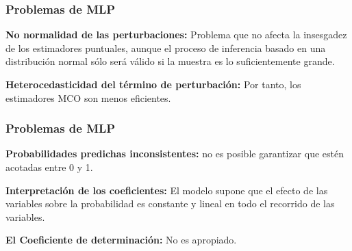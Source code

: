\documentclass[10pt]{beamer}
\begin{document}



\begin{frame}
\frametitle{Problemas de MLP}


\textbf{No normalidad de las perturbaciones:} Problema que no afecta la insesgadez de los estimadores puntuales, aunque el proceso de inferencia basado en una distribución normal sólo será válido si la muestra es lo suficientemente grande. 

\vspace{4mm}

\textbf{Heterocedasticidad del término de perturbación:} Por tanto, los estimadores MCO son menos eficientes. 



\end{frame}





\begin{frame}
\frametitle{Problemas de MLP}


\textbf{Probabilidades predichas inconsistentes:} no es posible garantizar que estén acotadas entre 0 y 1. 

\vspace{4mm}

\textbf{Interpretación de los coeficientes:} El modelo supone que el efecto de las variables sobre la probabilidad es constante y lineal en todo el recorrido de las variables. 

\vspace{4mm}

\textbf{El Coeficiente de determinación:} No es apropiado. 



\end{frame}


\end{document}
